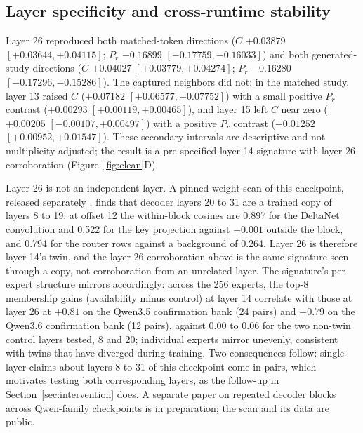 \documentclass[10pt,a4paper,twocolumn]{article}
\begin{document}
\subsection{Layer specificity and cross-runtime stability}\label{sec:layers}

Layer 26 reproduced both matched-token directions (\(C\) \(+0.03879\)
\([+0.03644,+0.04115]\); \(P_r\) \(-0.16899\) \([-0.17759,-0.16033]\)) and
both generated-study directions (\(C\) \(+0.04027\) \([+0.03779,+0.04274]\);
\(P_r\) \(-0.16280\) \([-0.17296,-0.15286]\)). The captured neighbors did not:
in the matched study, layer 13 raised \(C\) (\(+0.07182\)
\([+0.06577,+0.07752]\)) with a small positive \(P_r\) contrast (\(+0.00293\)
\([+0.00119,+0.00465]\)), and layer 15 left \(C\) near zero (\(+0.00205\)
\([-0.00107,+0.00497]\)) with a positive \(P_r\) contrast (\(+0.01252\)
\([+0.00952,+0.01547]\)). These secondary intervals are descriptive and not
multiplicity-adjusted; the result is a pre-specified layer-14 signature with
layer-26 corroboration (Figure~\ref{fig:clean}D).

Layer 26 is not an independent layer. A pinned weight scan of this
checkpoint, released separately \cite{shorthill2026blocks}, finds that
decoder layers 20 to 31 are a trained copy of layers 8 to 19: at offset 12
the within-block cosines are 0.897 for the DeltaNet convolution and 0.522
for the key projection against \(-0.001\) outside the block, and 0.794 for
the router rows against a background of 0.264. Layer 26 is therefore layer
14's twin, and the layer-26 corroboration above is the same signature seen
through a copy, not corroboration from an unrelated layer. The signature's per-expert structure
mirrors accordingly: across the 256 experts, the top-8 membership gains
(availability minus control) at layer 14 correlate with those at layer 26
at \(+0.81\) on the Qwen3.5 confirmation bank (24 pairs) and \(+0.79\) on
the Qwen3.6 confirmation bank (12 pairs), against 0.00 to 0.06 for the two
non-twin control layers tested, 8 and 20; individual experts mirror
unevenly, consistent with twins that have diverged during training. Two
consequences follow: single-layer claims about layers 8 to 31 of this
checkpoint come in pairs, which motivates testing both corresponding layers,
as the follow-up in Section~\ref{sec:intervention} does. A separate paper on
repeated decoder blocks across Qwen-family checkpoints is in preparation;
the scan and its data are public.
\end{document}

